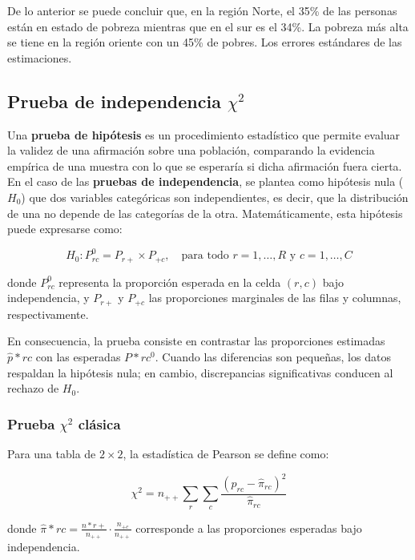 \documentclass[
  spanish,
  12pt,
]{book}
\begin{document}
De lo anterior se puede concluir que, en la región Norte, el 35\% de las personas están en estado de pobreza mientras que en el sur es el 34\%. La pobreza más alta se tiene en la región oriente con un 45\% de pobres. Los errores estándares de las estimaciones.

\subsection{\texorpdfstring{Prueba de independencia \(\chi^{2}\)}{Prueba de independencia \textbackslash chi\^{}\{2\}}}\label{prueba-de-independencia-chi2}

Una \textbf{prueba de hipótesis} es un procedimiento estadístico que permite evaluar la validez de una afirmación sobre una población, comparando la evidencia empírica de una muestra con lo que se esperaría si dicha afirmación fuera cierta. En el caso de las \textbf{pruebas de independencia}, se plantea como hipótesis nula (\(H_{0}\)) que dos variables categóricas son independientes, es decir, que la distribución de una no depende de las categorías de la otra. Matemáticamente, esta hipótesis puede expresarse como:

\[
H_0: P_{rc}^0 = P_{r+} \times P_{+c}, \quad \text{para todo } r = 1,\ldots,R \text{ y } c = 1,\ldots,C
\]

donde \(P_{rc}^0\) representa la proporción esperada en la celda \((r,c)\) bajo independencia, y \(P_{r+}\) y \(P_{+c}\) las proporciones marginales de las filas y columnas, respectivamente.

En consecuencia, la prueba consiste en contrastar las proporciones estimadas \(\hat{p}*{rc}\) con las esperadas \(P*{rc}^0\). Cuando las diferencias son pequeñas, los datos respaldan la hipótesis nula; en cambio, discrepancias significativas conducen al rechazo de \(H_0\).

\subsubsection{\texorpdfstring{Prueba \(\chi^{2}\) clásica}{Prueba \textbackslash chi\^{}\{2\} clásica}}\label{prueba-chi2-cluxe1sica}

Para una tabla de \(2 \times 2\), la estadística de Pearson se define como:

\[
\chi^{2}  =  n_{++}\sum_{r}\sum_{c}\frac{\left(p_{rc}-\hat{\pi}_{rc}\right)^{2}}{\hat{\pi}_{rc}}
\]

donde \(\hat{\pi}*{rc}=\frac{n*{r+}}{n_{++}} \cdot \frac{n_{+c}}{n_{++}}\) corresponde a las proporciones esperadas bajo independencia.
\end{document}
